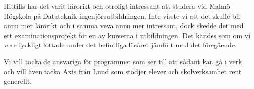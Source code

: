 
\begin{dedication} %

Hittills har det varit lärorikt och otroligt intressant att studera vid Malmö Högskola på Datateknik-ingenjörsutbildningen. Inte visste vi att det skulle bli ännu mer lärorikt och i samma veva ännu mer intressant, dock skedde det med ett examinationsprojekt för en av kurserna i utbildningen. Det kändes som om vi vore lyckligt lottade under det befintliga läsåret jämfört med det föregående.

Vi vill tacka de ansvariga för programmet som ser till att sådant kan gå i verk och vill även tacka Axis från Lund som stödjer elever och skolverksamhet rent generellt. 

\end{dedication}

